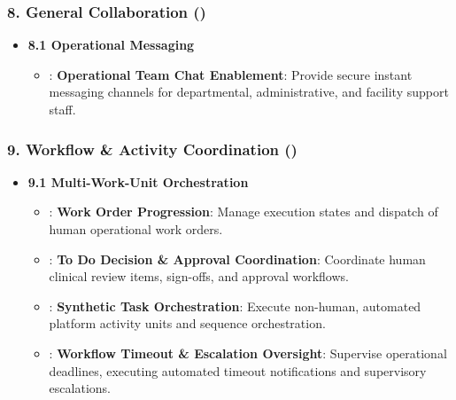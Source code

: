 \subsubsection*{8. General Collaboration (\texttt{})}
\label{rad:enabling:648}

\begin{itemize}

\item 
\textbf{8.1 Operational Messaging}


\begin{itemize}

\item 
\texttt{}: \textbf{Operational Team Chat Enablement}: Provide secure instant messaging channels for departmental, administrative, and facility support staff.



\end{itemize}


\end{itemize}
\label{rad:enabling:651}
\subsubsection*{9. Workflow \& Activity Coordination (\texttt{})}
\label{rad:enabling:652}

\begin{itemize}

\item 
\textbf{9.1 Multi-Work-Unit Orchestration}


\begin{itemize}

\item 
\texttt{}: \textbf{Work Order Progression}: Manage execution states and dispatch of human operational work orders.



\item 
\texttt{}: \textbf{To Do Decision \& Approval Coordination}: Coordinate human clinical review items, sign-offs, and approval workflows.



\item 
\texttt{}: \textbf{Synthetic Task Orchestration}: Execute non-human, automated platform activity units and sequence orchestration.



\item 
\texttt{}: \textbf{Workflow Timeout \& Escalation Oversight}: Supervise operational deadlines, executing automated timeout notifications and supervisory escalations.



\end{itemize}


\end{itemize}
\label{rad:enabling:658}
